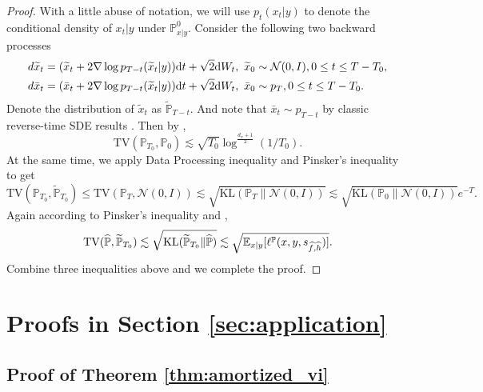 \documentclass[11pt]{article}
\numberwithin{equation}{section}
\renewcommand{\P}{\mathbb{P}}
\begin{document}
\begin{proof}
    With a little abuse of notation, we will use $p_t(x_t|y)$ to denote the conditional density of $x_t|y$ under $\P^0_{x|y}$.
    Consider the following two backward processes
    \begin{align}
        &d\widetilde{x}_t=(\widetilde{x}_t+2\nabla\log p_{T-t}(\widetilde{x}_t|y))\mathrm{d} t+\sqrt{2}\mathrm{d} W_t,\ \widetilde{x}_0\sim \mathcal{N}(0,I), 0\leq t\leq T-T_0,
        \\
        &d\bar{x}_t=(\bar{x}_t+2\nabla\log p_{T-t}(\widetilde{x}_t|y))\mathrm{d} t+\sqrt{2}\mathrm{d} W_t,\ \bar{x}_0\sim p_T, 0\leq t\leq T-T_0.
    \end{align}
    Denote the distribution of $\widetilde{x}_t$ as $\widetilde{\P}_{T-t}$.
    And note that $\bar{x}_t\sim p_{T-t}$ by classic reverse-time SDE results \citep{anderson1982reverse}. 
    Then by \citet[Lemma D.5]{fu2024unveil},
    \begin{equation}
        \mathrm{TV}(\P_{T_0},\P_0)\lesssim \sqrt{T_0}\log^{\frac{d_x+1}{2}}(1/T_0).
    \end{equation}
    At the same time, we apply Data Processing inequality and Pinsker's inequality to get
    \begin{equation}
        \mathrm{TV}(\P_{T_0},\widetilde{\P}_{T_0})\leq \mathrm{TV}(\P_{T},\mathcal{N}(0,I))\lesssim \sqrt{\mathrm{KL}(\P_{T}\|\mathcal{N}(0,I))}\lesssim \sqrt{\mathrm{KL}(\P_0\|\mathcal{N}(0,I))}e^{-T}.
    \end{equation}
    Again according to Pinsker's inequality and \citet[Proposition D.1]{oko2023diffusion},
    \begin{equation}
        \mathrm{TV}(\widehat{\P},\widetilde{\P}_{T_0})
        \lesssim \sqrt{\mathrm{KL}(\widetilde{\P}_{T_0}\|\widehat{\P})}\lesssim \sqrt{\E_{x|y}[\ell^\P(x,y,s_{\widehat{f},\widehat{h}})]}.
    \end{equation}
    Combine three inequalities above and we complete the proof.
\end{proof}

\section{Proofs in Section \ref{sec:application}}

\subsection{Proof of Theorem \ref{thm:amortized_vi}}\label{app:subsec:proof_avi}
\end{document}

